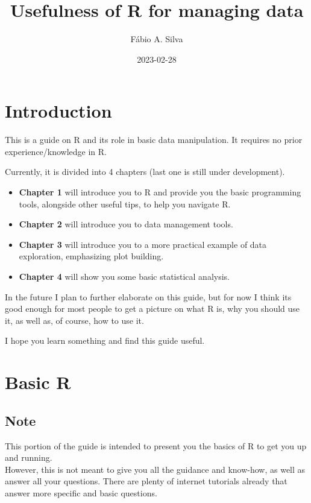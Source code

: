 \documentclass[
]{book}
\title{Usefulness of R for managing data}
\author{Fábio A. Silva}
\date{2023-02-28}
\begin{document}
\maketitle

{
\setcounter{tocdepth}{1}
\tableofcontents
}
\hypertarget{introduction}{%
\chapter{Introduction}\label{introduction}}

This is a guide on R and its role in basic data manipulation.
It requires no prior experience/knowledge in R.

Currently, it is divided into 4 chapters (last one is still under development).

\begin{itemize}
\item
  \textbf{Chapter 1} will introduce you to R and provide you the basic programming tools, alongside other useful tips, to help you navigate R.
\item
  \textbf{Chapter 2} will introduce you to data management tools.
\item
  \textbf{Chapter 3} will introduce you to a more practical example of data exploration, emphasizing plot building.
\item
  \textbf{Chapter 4} will show you some basic statistical analysis.
\end{itemize}

In the future I plan to further elaborate on this guide, but for now I think its good enough for most people to get a picture on what R is, why you should use it, as well as, of course, how to use it.

I hope you learn something and find this guide useful.

\hypertarget{basic-r}{%
\chapter{Basic R}\label{basic-r}}

\hypertarget{note}{%
\section{Note}\label{note}}

This portion of the guide is intended to present you the basics of R to get you up and running.\\

However, this is not meant to give you all the guidance and know-how, as well as answer all your questions.
There are plenty of internet tutorials already that answer more specific and basic questions.\\
\end{document}
